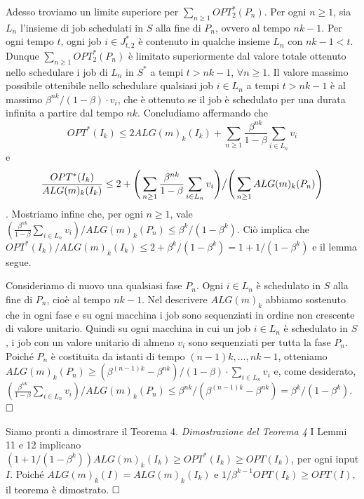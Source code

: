 \documentclass[12pt]{article}
\begin{document}
Adesso troviamo un limite superiore per $\sum_{n \geq 1} OPT^{*}_{2}(P_{n})$. Per ogni $n \geq 1$, sia $L_{n}$ l'insieme di job schedulati in $S$ alla fine di $P_{n}$, ovvero al tempo $nk - 1$. Per ogni tempo $t$, ogni job $i \in J_{t,2}^{*}$ è contenuto in qualche insieme $L_{n}$ con $nk - 1 <t$. Dunque $\sum_{n \geq 1} OPT^{*}_{2}(P_{n})$ è limitato superiormente dal valore totale ottenuto nello schedulare i job di $L_{n}$ in $S^{*}$ a tempi $t > nk - 1$, $\forall n \geq 1$. Il valore massimo possibile ottenibile nello schedulare qualsiasi job $i \in L_{n}$ a tempi $t> nk - 1$ è al massimo $\beta^{nk} / (1 - \beta) \cdot v_{i}$, che è ottenuto se il job è schedulato per una durata infinita a partire dal tempo $nk$. Concludiamo affermando che
$$OPT^{*}(I_{k}) \leq 2ALG(m)_{k}(I_{k}) + \sum_{n \geq 1} \frac{\beta^{nk}} {1 - \beta } \sum_{i \in L_{n}} v_{i} $$
e 
$$\frac{OPT^{*}(I_{k})} {ALG(m)_{k}(I_{k})} \leq 2 + \Bigg( \sum_{n \geq 1} \frac{\beta^{nk}} {1 - \beta} \sum_{i \in L_{n}} v_{i} \Bigg) \big{\slash} \Bigg( \sum_{n \geq 1} ALG(m)_{k}(P_{n}) \Bigg)$$.
Mostriamo infine che, per ogni $n \geq 1$, vale $(\frac {\beta^{nk}}{1 - \beta} \sum_{i \in L_{n}} v_{i}) / ALG(m)_{k}(P_{n}) \leq \beta^{k} / (1 - \beta^{k}).$  Ciò implica che $OPT^{*}(I_{k}) / ALG(m)_{k}(I_{k}) \leq 2 + \beta^{k} / (1 - \beta^{k}) = 1 + 1 / (1- \beta^{k})$ e il lemma segue.

Consideriamo di nuovo una qualsiasi fase $P_{n}$. Ogni $i \in L_{n}$ è schedulato in $S$ alla fine di $P_{n}$, cioè al tempo $nk - 1$. Nel descrivere $ALG(m)_{k}$ abbiamo sostenuto che in ogni fase e su ogni macchina i job sono sequenziati in ordine non crescente di valore unitario. Quindi su ogni macchina in cui un job $i \in L_{n}$ è schedulato in $S$, i job con un valore unitario di almeno $v_{i}$ sono sequenziati per tutta la fase $P_{n}$. Poiché $P_{n}$ è costituita da istanti di tempo $(n - 1) k ,..., nk - 1$, otteniamo $ALG(m)_{k}(P_{n}) \geq (\beta^{(n - 1) k} - \beta^{nk}) / (1 - \beta) \cdot \sum_{i \in L_{n}} v_{i}$ e, come desiderato, $(\frac{\beta^{nk}} {1 - \beta} \sum_{i \in L_{n}} v_{i}) / ALG(m)_{k}(P_{n}) \leq \beta^{nk} / (\beta^{(n - 1) k} - \beta^{nk}) = \beta^{k} / (1 - \beta^{k}).$ $\hfill \square$

Siamo pronti a dimostrare il Teorema 4.
\newline \newline
\textit{Dimostrazione del Teorema 4} I Lemmi 11 e 12 implicano $(1 + 1 / (1 - \beta^{k}))ALG(m)_{k}(I_{k}) \geq OPT^{*}(I_{k}) \geq OPT (I_{k})$, per ogni input $I$. Poiché $ALG(m)_{k}(I) = ALG(m)_{k}(I_{k})$ e $1 / \beta^{k-1}OPT (I_{k}) \geq OPT (I)$, il teorema è dimostrato. $\hfill \square$
\end{document}
